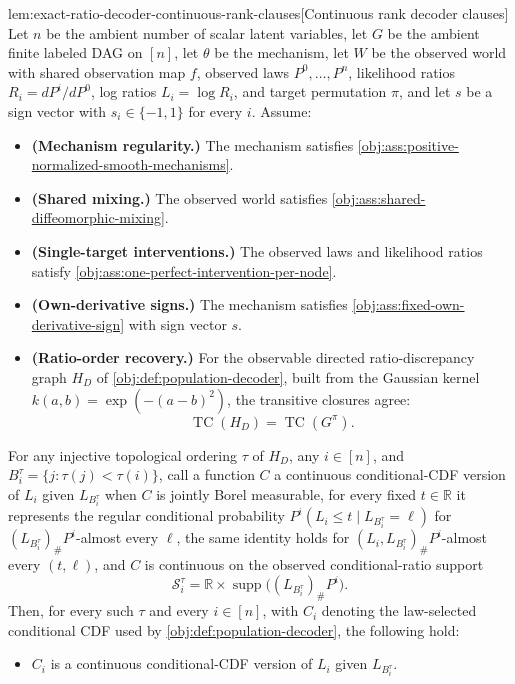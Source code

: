 \documentclass[11pt]{article}
\begin{document}
\begin{lemmav}{lem:exact-ratio-decoder-continuous-rank-clauses}[Continuous rank decoder clauses]
Let \(n\) be the ambient number of scalar latent variables, let \(G\) be the ambient finite labeled DAG on \([n]\), let \(\theta\) be the mechanism, let \(W\) be the observed world with shared observation map \(f\), observed laws \(P^0,\ldots,P^n\), likelihood ratios \(R_i=dP^i/dP^0\), log ratios \(L_i=\log R_i\), and target permutation \(\pi\), and let \(s\) be a sign vector with \(s_i\in\{-1,1\}\) for every \(i\). Assume:
\begin{itemize}
\item \textbf{(Mechanism regularity.)} The mechanism satisfies \cref{obj:ass:positive-normalized-smooth-mechanisms}.
\item \textbf{(Shared mixing.)} The observed world satisfies \cref{obj:ass:shared-diffeomorphic-mixing}.
\item \textbf{(Single-target interventions.)} The observed laws and likelihood ratios satisfy \cref{obj:ass:one-perfect-intervention-per-node}.
\item \textbf{(Own-derivative signs.)} The mechanism satisfies \cref{obj:ass:fixed-own-derivative-sign} with sign vector \(s\).
\item \textbf{(Ratio-order recovery.)} For the observable directed ratio-discrepancy graph \(H_D\) of \cref{obj:def:population-decoder}, built from the Gaussian kernel \(k(a,b)=\exp(-(a-b)^2)\), the transitive closures agree:
\[
\operatorname{TC}(H_D)=\operatorname{TC}(G^\pi).
\]
\end{itemize}
For any injective topological ordering \(\tau\) of \(H_D\), any \(i\in[n]\), and \(B_i^\tau=\{j:\tau(j)<\tau(i)\}\), call a function \(C\) a continuous conditional-CDF version of \(L_i\) given \(L_{B_i^\tau}\) when \(C\) is jointly Borel measurable, for every fixed \(t\in\mathbb R\) it represents the regular conditional probability \(P^i(L_i\le t\mid L_{B_i^\tau}=\ell)\) for \((L_{B_i^\tau})_{\#}P^i\)-almost every \(\ell\), the same identity holds for \((L_i,L_{B_i^\tau})_{\#}P^i\)-almost every \((t,\ell)\), and \(C\) is continuous on the observed conditional-ratio support
\[
\mathcal S_i^\tau=\mathbb R\times\operatorname{supp}\bigl((L_{B_i^\tau})_{\#}P^i\bigr).
\]
Then, for every such \(\tau\) and every \(i\in[n]\), with \(C_i\) denoting the law-selected conditional CDF used by \cref{obj:def:population-decoder}, the following hold:
\begin{itemize}
\item \(C_i\) is a continuous conditional-CDF version of \(L_i\) given \(L_{B_i^\tau}\).

\end{itemize}
\end{lemmav}
\end{document}
